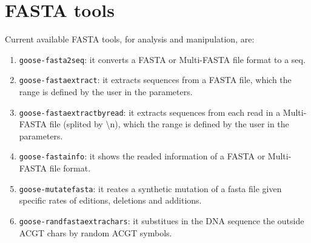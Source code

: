 \chapter{FASTA tools}
\label{fasta}

Current available FASTA tools, for analysis and manipulation, are:
\begin{enumerate}
\item \texttt{goose-fasta2seq}: it converts a FASTA or Multi-FASTA file format to a seq.
\item \texttt{goose-fastaextract}: it extracts sequences from a FASTA file, which the range is defined by the user in the parameters.
\item \texttt{goose-fastaextractbyread}: it extracts sequences from each read in a Multi-FASTA file (splited by \textbackslash n), which the range is defined by the user in the parameters.
\item \texttt{goose-fastainfo}: it shows the readed information of a FASTA or Multi-FASTA file format.
\item \texttt{goose-mutatefasta}: it reates a synthetic mutation of a fasta file given specific rates of editions, deletions and additions.
\item \texttt{goose-randfastaextrachars}: it substitues in the DNA sequence the outside ACGT chars by random ACGT symbols.

\end{enumerate}




 




